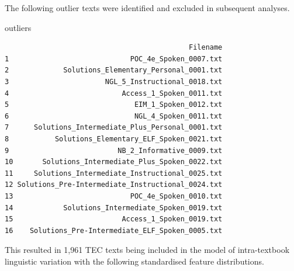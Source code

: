 \documentclass[
  letterpaper,
  DIV=11,
  numbers=noendperiod]{scrreprt}
\newenvironment{Shaded}{\begin{snugshade}}{\end{snugshade}}
\newcommand{\CommentTok}[1]{\textcolor[rgb]{0.37,0.37,0.37}{#1}}
\newcommand{\FunctionTok}[1]{\textcolor[rgb]{0.28,0.35,0.67}{#1}}
\newcommand{\NormalTok}[1]{\textcolor[rgb]{0.00,0.23,0.31}{#1}}
\newcommand{\OtherTok}[1]{\textcolor[rgb]{0.00,0.23,0.31}{#1}}
\newcommand{\SpecialCharTok}[1]{\textcolor[rgb]{0.37,0.37,0.37}{#1}}
\begin{document}
The following outlier texts were identified and excluded in subsequent
analyses.

\begin{Shaded}
\begin{Highlighting}[]
\NormalTok{outliers}
\end{Highlighting}
\end{Shaded}

\begin{verbatim}
                                            Filename
1                             POC_4e_Spoken_0007.txt
2             Solutions_Elementary_Personal_0001.txt
3                       NGL_5_Instructional_0018.txt
4                           Access_1_Spoken_0011.txt
5                              EIM_1_Spoken_0012.txt
6                              NGL_4_Spoken_0011.txt
7      Solutions_Intermediate_Plus_Personal_0001.txt
8           Solutions_Elementary_ELF_Spoken_0021.txt
9                          NB_2_Informative_0009.txt
10       Solutions_Intermediate_Plus_Spoken_0022.txt
11     Solutions_Intermediate_Instructional_0025.txt
12 Solutions_Pre-Intermediate_Instructional_0024.txt
13                            POC_4e_Spoken_0010.txt
14            Solutions_Intermediate_Spoken_0019.txt
15                          Access_1_Spoken_0019.txt
16    Solutions_Pre-Intermediate_ELF_Spoken_0005.txt
\end{verbatim}

\begin{Shaded}
\end{Shaded}

This resulted in 1,961 TEC texts being included in the model of
intra-textbook linguistic variation with the following standardised
feature distributions.
\end{document}
